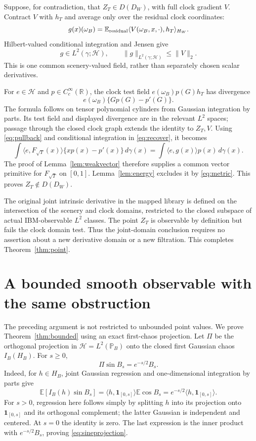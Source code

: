 \documentclass[11pt]{article}
\newcommand{\R}{\mathbb R}\newcommand{\E}{\mathbb E}
\newcommand{\Hh}{\mathcal H}\newcommand{\code}[1]{{\small\nolinkurl{#1}}}
\begin{document}
Suppose, for contradiction, that $Z_T\in D(D_W)$,
with full clock gradient $V$. Contract $V$ with $h_T$
and average only over the residual clock coordinates:
\begin{equation}\label{eq:recover}
 g(x)(\omega_B)=
 \E_{\rm residual}\langle V(\omega_B,x,\cdot),h_T\rangle_{H_W}.
\end{equation}
Hilbert-valued conditional integration and Jensen give
\[
 g\in L^2(\gamma;\Hh),\qquad
 \|g\|_{L^2(\gamma;\Hh)}\leq\|V\|_2.
\]
This is one common scenery-valued field, rather than
separately chosen scalar derivatives.

For $e\in\Hh$ and $p\in C_c^\infty(\R)$, the
clock test field $e(\omega_B)p(G)h_T$ has divergence
\[
 e(\omega_B)\{G p(G)-p'(G)\}.
\]
The formula follows on tensor polynomial cylinders
from Gaussian integration by parts. Its test field
and displayed divergence are in the relevant $L^2$
spaces; passage through the closed clock graph extends
the identity to $Z_T,V$. Using \eqref{eq:pullback}
and conditional integration in \eqref{eq:recover}, it
becomes
\[
 \int\langle e,F_{\sqrt T}(x)\rangle
          \{xp(x)-p'(x)\}\,d\gamma(x)
 =\int\langle e,g(x)\rangle p(x)\,d\gamma(x).
\]
The proof of Lemma~\ref{lem:weakvector} therefore
supplies a common vector primitive for $F_{\sqrt T}$
on $[0,1]$. Lemma~\ref{lem:energy} excludes it by
\eqref{eq:metric}. This proves $Z_T\notin D(D_W)$.

The original joint intrinsic derivative in the mapped
library is defined on the intersection of the scenery
and clock domains, restricted to the closed subspace
of actual IBM-observable $L^2$ classes. The point
$Z_T$ is observable by definition but fails the clock
domain test. Thus the joint-domain conclusion requires
no assertion about a new derivative domain or a new
filtration. This completes Theorem~\ref{thm:point}.

\section{A bounded smooth observable with the same obstruction}
The preceding argument is not restricted to unbounded
point values. We prove Theorem~\ref{thm:bounded} using
an exact first-chaos projection.
Let $\Pi$ be the orthogonal projection in
$\Hh=L^2(\mathbb P_B)$ onto the closed first Gaussian
chaos $I_B(H_B)$. For $s\geq0$,
\begin{equation}\label{eq:sineprojection}
 \Pi\sin B_s=e^{-s/2}B_s.
\end{equation}
Indeed, for $h\in H_B$, joint Gaussian regression and
one-dimensional integration by parts give
\[
 \E[I_B(h)\sin B_s]
 =\langle h,\mathbf1_{[0,s]}\rangle\E\cos B_s
 =e^{-s/2}\langle h,\mathbf1_{[0,s]}\rangle.
\]
For $s>0$, regression here follows simply by splitting
$h$ into its projection onto $\mathbf1_{[0,s]}$ and
its orthogonal complement; the latter Gaussian is
independent and centered. At $s=0$ the identity is zero.
The last expression is the inner product with
$e^{-s/2}B_s$, proving \eqref{eq:sineprojection}.
\end{document}
